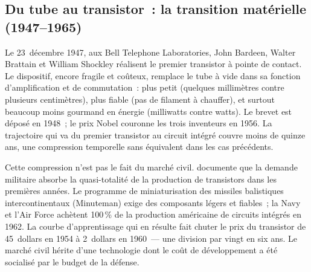 
\subsection{Du tube au transistor~: la transition matérielle (1947--1965)}\label{subsec:transistor}

%
Le 23~décembre 1947, aux Bell Telephone Laboratories, John Bardeen, Walter Brattain et William Shockley réalisent le premier transistor à pointe de contact. Le dispositif, encore fragile et coûteux, remplace le tube à vide dans sa fonction d'amplification et de commutation~: plus petit (quelques millimètres contre plusieurs centimètres), plus fiable (pas de filament à chauffer), et surtout beaucoup moins gourmand en énergie (milliwatts contre watts). Le brevet est déposé en 1948~; le prix Nobel couronne les trois inventeurs en 1956. La trajectoire qui va du premier transistor au circuit intégré couvre moins de quinze ans, une compression temporelle sans équivalent dans les cas précédents.

%
Cette compression n'est pas le fait du marché civil. \textcite{flamm_creating_1988} documente que la demande militaire absorbe la quasi-totalité de la production de transistors dans les premières années. Le programme de miniaturisation des missiles balistiques intercontinentaux (Minuteman) exige des composants légers et fiables~; la Navy et l'Air Force achètent 100\,\% de la production américaine de circuits intégrés en 1962. La courbe d'apprentissage qui en résulte fait chuter le prix du transistor de 45~dollars en 1954 à 2~dollars en 1960~--- une division par vingt en six ans. Le marché civil hérite d'une technologie dont le coût de développement a été socialisé par le budget de la défense.

